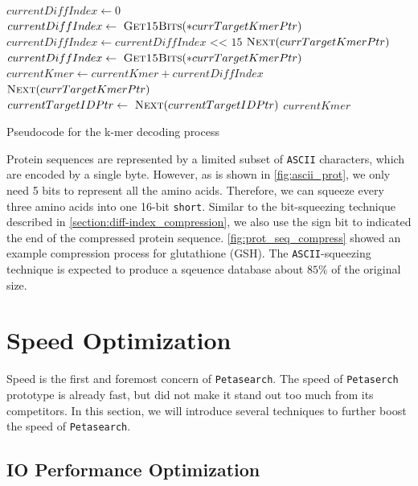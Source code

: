 \begin{algorithm}[htbp]
  \begin{algorithmic}

    \State $currentDiffIndex \gets 0$\;
    \State $currentDiffIndex \gets\ \textsc{Get15Bits}(*currTargetKmerPtr)$
    \State $currentDiffIndex \gets currentDiffIndex \texttt{ << } 15$
    \State $\textsc{Next}(currTargetKmerPtr)$
    \EndWhile
    \State $currentDiffIndex \gets\ \textsc{Get15Bits}(*currTargetKmerPtr)$
    \State $currentKmer \gets currentKmer + currentDiffIndex$
    \State $\textsc{Next}(currTargetKmerPtr)$
    \State $currentTargetIDPtr \gets\ \textsc{Next}(currentTargetIDPtr)$
    \Return $currentKmer$
    \EndProcedure
    \caption{ Pseudocode for the k-mer decoding process} \label{algorithm:decode_kmer}
  \end{algorithmic}
\end{algorithm}

Protein sequences are represented by a limited subset of \texttt{ASCII} characters, which are encoded by a single byte. However, as is shown in \autoref{fig:ascii_prot}, we only need 5 bits to represent all the amino acids. Therefore, we can squeeze every three amino acids into one 16-bit \texttt{short}. Similar to the bit-squeezing technique described in \cref{section:diff-index_compression}, we also use the sign bit to indicated the end of the compressed protein sequence. \autoref{fig:prot_seq_compress} showed an example compression process for glutathione (GSH). The \texttt{ASCII}-squeezing technique is expected to produce a sqeuence database about $85\%$ of the original size.

\section{Speed Optimization}

Speed is the first and foremost concern of \texttt{Petasearch}. The speed of \texttt{Petaserch} prototype is already fast, but did not make it stand out too much from its competitors. In this section, we will introduce several techniques to further boost the speed of \texttt{Petasearch}.

\subsection{IO Performance Optimization}

